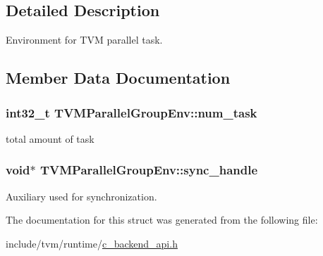 \subsection{Detailed Description}
Environment for T\+VM parallel task. 

\subsection{Member Data Documentation}
\subsubsection[{\texorpdfstring{num\+\_\+task}{num_task}}]{\setlength{\rightskip}{0pt plus 5cm}int32\+\_\+t T\+V\+M\+Parallel\+Group\+Env\+::num\+\_\+task}\hypertarget{structTVMParallelGroupEnv_a6ff807972a918ee61dfc158abce825f6}{}\label{structTVMParallelGroupEnv_a6ff807972a918ee61dfc158abce825f6}


total amount of task 

\subsubsection[{\texorpdfstring{sync\+\_\+handle}{sync_handle}}]{\setlength{\rightskip}{0pt plus 5cm}void$\ast$ T\+V\+M\+Parallel\+Group\+Env\+::sync\+\_\+handle}\hypertarget{structTVMParallelGroupEnv_a0633fa0370c01f1ab38948a53801d90c}{}\label{structTVMParallelGroupEnv_a0633fa0370c01f1ab38948a53801d90c}


Auxiliary used for synchronization. 



The documentation for this struct was generated from the following file\+:\begin{DoxyCompactItemize}
\item 
include/tvm/runtime/\hyperlink{c__backend__api_8h}{c\+\_\+backend\+\_\+api.\+h}\end{DoxyCompactItemize}
